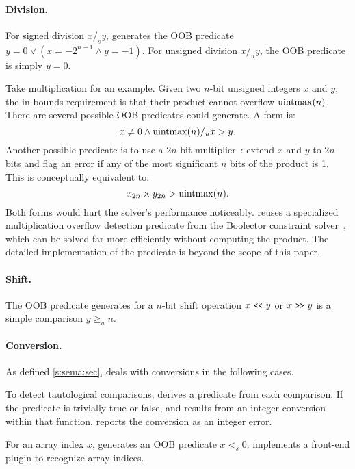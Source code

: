 \paragraph{Division.}
For signed division $x /_s y$, \sys generates the OOB predicate
$y = 0 \lor (x = -2^{n-1} \land y = -1)$.
For unsigned division $x /_u y$, the OOB predicate is simply
$y = 0$.

Take multiplication for an example.  Given two $n$-bit unsigned
integers $x$ and $y$, the in-bounds requirement is that their product
cannot overflow $\operatorname{uintmax}(n)$.  There are several possible OOB
predicates \sys could generate.
A \naive form is:
\begin{equation*}
x \neq 0 \land \operatorname{uintmax}(n) /_u x > y.
\end{equation*}
Another possible predicate is to use a $2n$-bit
multiplier~\cite{molnar:catchconv}: extend $x$ and $y$ to $2n$ bits
and flag an error if any of the most significant $n$ bits of the
product is 1.  This is conceptually equivalent to:
\begin{equation*}
x_{2n} \times y_{2n} > \operatorname{uintmax}(n).
\end{equation*}
Both forms would hurt the solver's performance noticeably.
%
\sys reuses a specialized multiplication overflow detection predicate
from the Boolector constraint
solver~\cite[\chapterautorefname~3.5]{brummayer:phd}, which can be
solved far more efficiently without computing the product.  The
detailed implementation of the predicate is beyond the scope of
this paper.
\fi

\paragraph{Shift.}
The OOB predicate \sys generates for a $n$-bit shift operation
$x \shl y$ or $x \shr y$ is a simple comparison $y \geq_u n$.

\paragraph{Conversion.}
As defined \autoref{s:sema:sec}, \sys deals with conversions
in the following cases.

To detect tautological comparisons, \sys derives a predicate from
each comparison.  If the predicate is trivially true or false,
and results from an integer conversion within that function, \sys
reports the conversion as an integer error.

For an array index $x$, \sys generates an OOB predicate $x <_s 0$.
\sys implements a front-end plugin to recognize array indices.

